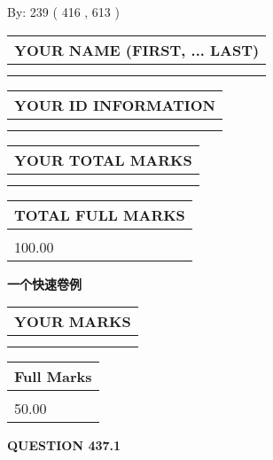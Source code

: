 \documentclass{ctexart}
\begin{document}
   
\hspace{1.0in} By: 
 239 ( 416 ,  613 )
   
   
   
   
\newpage 
\setcounter{page}{ 
   437001 } 
   
   
   
   
\noindent\begin{tabular}{|l|}
\hline
YOUR NAME (FIRST, ... LAST)  \\
\hline
 \\ 
 \\ 
\hline
\end{tabular}
\hspace{0.05in} \begin{tabular}{|l|}
\hline
 YOUR   ID   INFORMATION  \\
\hline
 \\ 
 \\ 
\hline
\end{tabular}
   
   
\vspace{0.2in}\noindent\begin{tabular}{|l|}
\hline
YOUR TOTAL MARKS  \\
\hline
 \\ 
 \\ 
\hline
\end{tabular}
\hspace{0.05in} \begin{tabular}{|l|}
\hline
TOTAL FULL MARKS  \\
\hline
 \\ 
100.00 \\
\hline
\end{tabular}
   
   
 \vspace{0.2in}
{\LARGE {\textbf{ 一个快速卷例}}}
   
   
  
\vspace{0.2in}
  
\noindent\begin{tabular}{|l|}
\hline
 YOUR MARKS  \\
\hline
 \\ 
 \\ 
\hline
\end{tabular}
\hspace{0.05in} \begin{tabular}{|l|}
\hline
 Full Marks  \\
\hline
 \\ 
50.00 \\
\hline
\end{tabular}
{\textbf{\Large{QUESTION
437.1 
}}}
  
\end{document}
